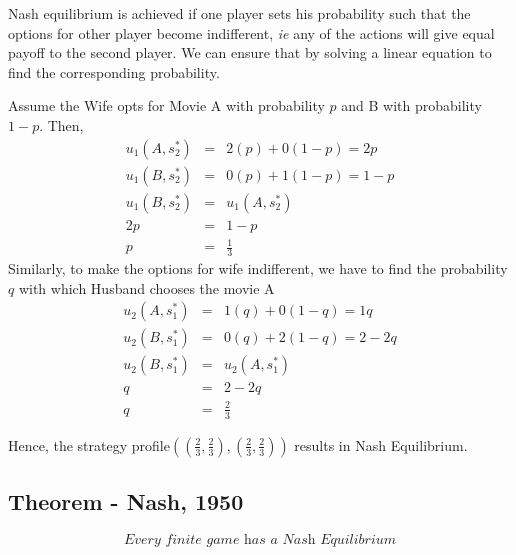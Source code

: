	Nash equilibrium is achieved if one player sets his probability such that the options for other player become indifferent, \textit{ie} any of the actions will give equal payoff to the second player. We can ensure that by solving a linear equation to find the corresponding probability. 

Assume the Wife opts for Movie A with probability $p$ and B with probability $1-p$. Then,
\begin{eqnarray}
u_1(A, s^*_2) &=& 2 (p) + 0(1-p) = 2p\\
u_1(B, s^*_2) &=& 0 (p) + 1(1-p)= 1-p\\
u_1(B, s^*_2) &=& u_1(A, s^*_2) \\
2p&=&1-p\\
p &=& \frac{1}{3}
\end{eqnarray}	
Similarly, to make the options for wife indifferent, we have to find the probability $q$ with which Husband chooses the movie A
\begin{eqnarray}
u_2(A, s^*_1) &=& 1 (q) + 0(1-q) = 1q\\
u_2(B, s^*_1) &=& 0 (q) + 2(1-q)= 2 - 2q\\
u_2(B, s^*_1) &=& u_2(A, s^*_1) \\
q&=&2-2q\\
q &=& \frac{2}{3}
\end{eqnarray}	

Hence, the strategy profile$ \left( \left(\displaystyle{\frac{2}{3}},\displaystyle{\frac{2}{3}}\right),\left(\displaystyle{\frac{2}{3}},\displaystyle{\frac{2}{3}}\right)\right)$ results in Nash Equilibrium.
\subsection{Theorem - Nash, 1950}
$$\textit{Every finite game has a Nash Equilibrium}$$
